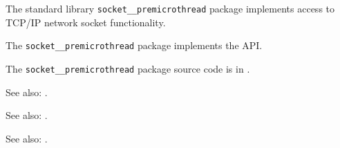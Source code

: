 
The standard library {\tt socket\_\_premicrothread} package implements access to {\sc TCP/IP} network socket functionality.

The {\tt socket\_\_premicrothread} package implements the  API.

The {\tt socket\_\_premicrothread} package source code is in .

See also:  .

See also:  .

See also:  .
